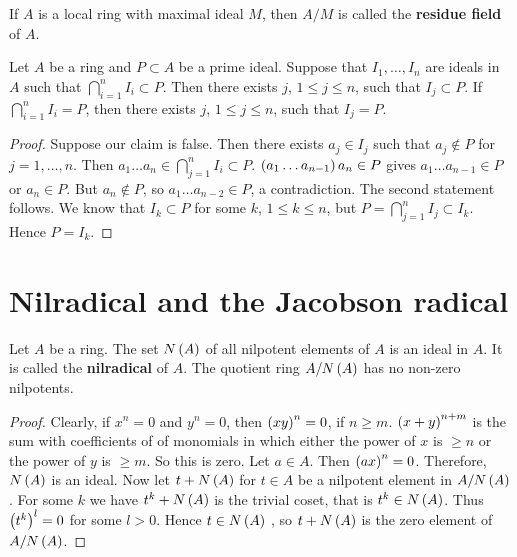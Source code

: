 If $ A $ is a local ring with maximal ideal $ M $, then $ A / M $ is called the \textbf{residue field} of $ A $.

\begin{lemma}
\label{lem:4.12}
Let $ A $ be a ring and $ P \subset A $ be a prime ideal. Suppose that $ I_1, \dots, I_n $ are ideals in $ A $ such that $ \bigcap_{i = 1}^n I_i \subset P $. Then there exists $ j $, $ 1 \le j \le n $, such that $ I_j \subset P $. If $ \bigcap_{i = 1}^n I_i = P $, then there exists $ j $, $ 1 \le j \le n $, such that $ I_j = P $.
\end{lemma}

\begin{proof}
Suppose our claim is false. Then there exists $ a_j \in I_j $ such that $ a_j \notin P $ for $ j = 1, \dots, n $. Then $ a_1 \dots a_n \in \bigcap_{j = 1}^n I_i \subset P $. $ \left( a_1 \dots a_{n - 1} \right)a_n \in P $ gives $ a_1 \dots a_{n - 1} \in P $ or $ a_n \in P $. But $ a_n \notin P $, so $ a_1 \dots a_{n - 2} \in P $, a contradiction. The second statement follows. We know that $ I_k \subset P $ for some $ k $, $ 1 \le k \le n $, but $ P = \bigcap_{j = 1}^n I_j \subset I_k $. Hence $ P = I_k $.
\end{proof}

\pagebreak

\section{Nilradical and the Jacobson radical}


\begin{proposition}
Let $ A $ be a ring. The set $ N\left( A \right) $ of all nilpotent elements of $ A $ is an ideal in $ A $. It is called the \textbf{nilradical} of $ A $. The quotient ring $ A / N\left( A \right) $ has no non-zero nilpotents.
\end{proposition}

\begin{proof}
Clearly, if $ x^n = 0 $ and $ y^n = 0 $, then $ \left( xy \right)^n = 0 $, if $ n \ge m $. $ \left( x + y \right)^{n + m} $ is the sum with coefficients of of monomials in which either the power of $ x $ is $ \ge n $ or the power of $ y $ is $ \ge m $. So this is zero. Let $ a \in A $. Then $ \left( ax \right)^n = 0 $. Therefore, $ N\left( A \right) $ is an ideal. Now let $ t + N\left( A \right) $ for $ t \in A $ be a nilpotent element in $ A / N\left( A \right) $. For some $ k $ we have $ t^k + N\left( A \right) $ is the trivial coset, that is $ t^k \in N\left( A \right) $. Thus $ \left( t^k \right)^l = 0 $ for some $ l > 0 $. Hence $ t \in N\left( A \right) $ , so $ t + N\left( A \right) $ is the zero element of $ A / N\left( A \right) $.
\end{proof}

